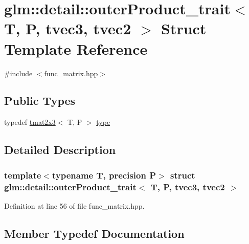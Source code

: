 \hypertarget{structglm_1_1detail_1_1outer_product__trait_3_01_t_00_01_p_00_01tvec3_00_01tvec2_01_4}{}\section{glm\+::detail\+::outer\+Product\+\_\+trait$<$ T, P, tvec3, tvec2 $>$ Struct Template Reference}
\label{structglm_1_1detail_1_1outer_product__trait_3_01_t_00_01_p_00_01tvec3_00_01tvec2_01_4}


{\ttfamily \#include $<$func\+\_\+matrix.\+hpp$>$}

\subsection*{Public Types}
\begin{DoxyCompactItemize}
\item 
typedef \mbox{\hyperlink{structglm_1_1tmat2x3}{tmat2x3}}$<$ T, P $>$ \mbox{\hyperlink{structglm_1_1detail_1_1outer_product__trait_3_01_t_00_01_p_00_01tvec3_00_01tvec2_01_4_a32c937f071826a01c5e1d80ef32f8740}{type}}
\end{DoxyCompactItemize}


\subsection{Detailed Description}
\subsubsection*{template$<$typename T, precision P$>$\newline
struct glm\+::detail\+::outer\+Product\+\_\+trait$<$ T, P, tvec3, tvec2 $>$}



Definition at line 56 of file func\+\_\+matrix.\+hpp.



\subsection{Member Typedef Documentation}
\mbox{\label{structglm_1_1detail_1_1outer_product__trait_3_01_t_00_01_p_00_01tvec3_00_01tvec2_01_4_a32c937f071826a01c5e1d80ef32f8740}} 
